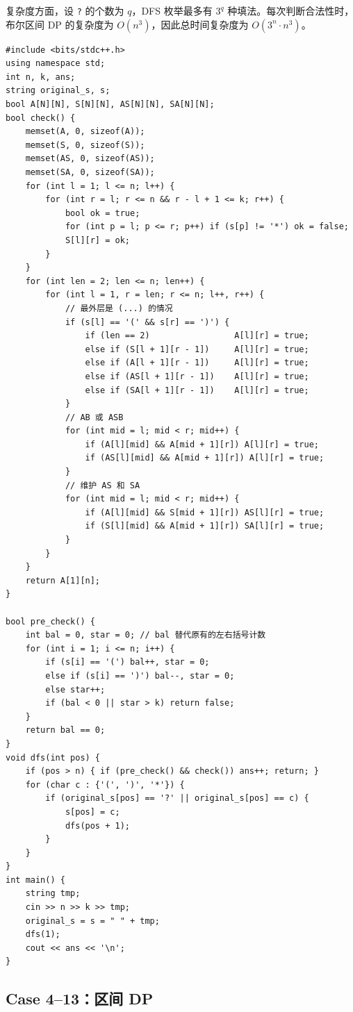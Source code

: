 \documentclass{book}
\newcommand{\code}[1]{\colorbox{codebg}{\texttt{#1}}}  %
\begin{document}
复杂度方面，设 \code{?} 的个数为 $q$，DFS 枚举最多有 $3^q$ 种填法。每次判断合法性时，布尔区间 DP 的复杂度为 $O(n^3)$，因此总时间复杂度为 $O(3^n\cdot n^3)$。
\newpage
\begin{lstlisting}[style = code]
#include <bits/stdc++.h>
using namespace std;
int n, k, ans; 
string original_s, s;
bool A[N][N], S[N][N], AS[N][N], SA[N][N];
bool check() {
    memset(A, 0, sizeof(A));
    memset(S, 0, sizeof(S));
    memset(AS, 0, sizeof(AS));
    memset(SA, 0, sizeof(SA));
    for (int l = 1; l <= n; l++) {
        for (int r = l; r <= n && r - l + 1 <= k; r++) {
            bool ok = true;
            for (int p = l; p <= r; p++) if (s[p] != '*') ok = false;
            S[l][r] = ok;
        }
    }
    for (int len = 2; len <= n; len++) {
        for (int l = 1, r = len; r <= n; l++, r++) {
            // 最外层是 (...) 的情况
            if (s[l] == '(' && s[r] == ')') {
                if (len == 2)                 A[l][r] = true; 
                else if (S[l + 1][r - 1])     A[l][r] = true; 
                else if (A[l + 1][r - 1])     A[l][r] = true; 
                else if (AS[l + 1][r - 1])    A[l][r] = true; 
                else if (SA[l + 1][r - 1])    A[l][r] = true; 
            }
            // AB 或 ASB
            for (int mid = l; mid < r; mid++) {
                if (A[l][mid] && A[mid + 1][r]) A[l][r] = true;
                if (AS[l][mid] && A[mid + 1][r]) A[l][r] = true;
            }
            // 维护 AS 和 SA
            for (int mid = l; mid < r; mid++) {
                if (A[l][mid] && S[mid + 1][r]) AS[l][r] = true;
                if (S[l][mid] && A[mid + 1][r]) SA[l][r] = true;
            }
        }
    }
    return A[1][n];
}

bool pre_check() {
    int bal = 0, star = 0; // bal 替代原有的左右括号计数
    for (int i = 1; i <= n; i++) {
        if (s[i] == '(') bal++, star = 0;
        else if (s[i] == ')') bal--, star = 0;
        else star++;
        if (bal < 0 || star > k) return false;
    }
    return bal == 0;
}
void dfs(int pos) {
    if (pos > n) { if (pre_check() && check()) ans++; return; }
    for (char c : {'(', ')', '*'}) {
        if (original_s[pos] == '?' || original_s[pos] == c) {
            s[pos] = c; 
            dfs(pos + 1);
        }
    }
}
int main() {
    string tmp; 
    cin >> n >> k >> tmp;
    original_s = s = " " + tmp; 
    dfs(1);
    cout << ans << '\n';
}
\end{lstlisting}
\subsection{Case 4--13：区间 DP}
\end{document}
